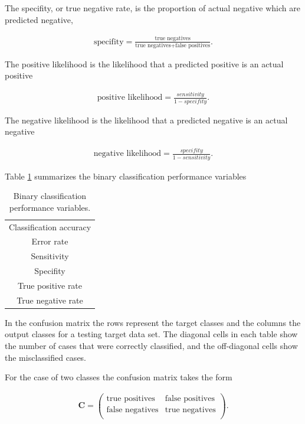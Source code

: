 The specifity, or true negative rate, is the proportion of actual negative which are predicted negative, 

\begin{eqnarray}\nonumber
\text{specifity} = \frac{\text{true negatives}}{\text{true negatives}+\text{false positives}}.
\end{eqnarray}
 
The positive likelihood is the likelihood that a predicted positive is an actual positive

\begin{eqnarray}\nonumber\label{PositiveLikelihood}
\text{positive likelihood} = \frac{sensitivity}{1-specifity}.
\end{eqnarray}

The negative likelihood is the likelihood that a predicted negative is an actual negative

\begin{eqnarray}\nonumber
\text{negative likelihood}= \frac{specifity}{1-sensitivity}.
\end{eqnarray}

Table \ref{BinaryClassificationPerformanceVariables} summarizes the binary classification performance variables

\begin{table}[h!]
\begin{center}
\begin{tabular}{c}
\hline
Classification accuracy\\
Error rate\\
Sensitivity\\
Specifity\\
True positive rate\\
True negative rate\\
\hline
\end{tabular}\caption{Binary classification performance variables.}
\label{BinaryClassificationPerformanceVariables}
\end{center}
\end{table}


In the confusion matrix the rows represent the target classes and the columns the output classes for a testing target data set. The diagonal cells in each table show the number of cases that were correctly
classified, and the off-diagonal cells show the misclassified cases. 

For the case of two classes the confusion matrix takes the form

\begin{eqnarray}\nonumber
\mathbf{C} = 
\left(
\begin{array}{cc}
\text{true positives} & \text{false positives} \\
\text{false negatives} & \text{true negatives} \\
\end{array}
\right).
\end{eqnarray}


